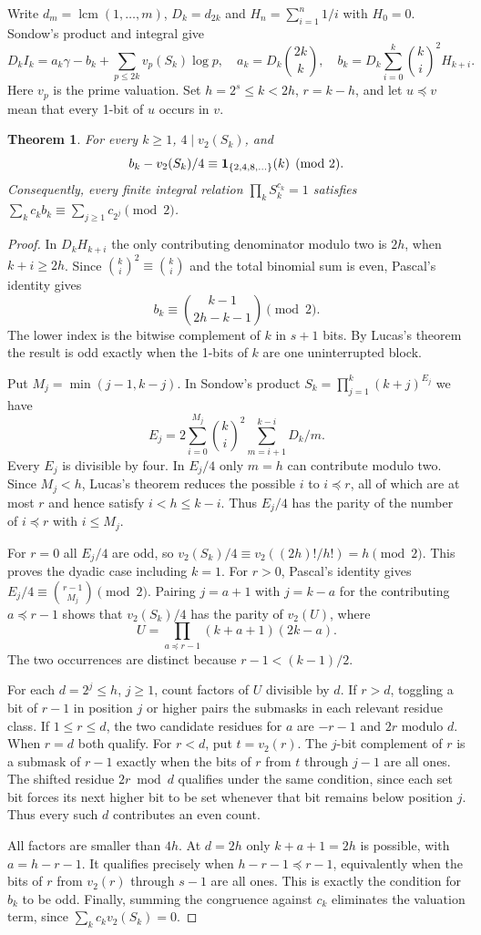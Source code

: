 \documentclass[11pt,a4paper]{article}
\newtheorem{theorem}{Theorem}[section]
\theoremstyle{definition}\newtheorem{definition}[theorem]{Definition}\newtheorem{example}[theorem]{Example}
\theoremstyle{remark}\newtheorem{remark}[theorem]{Remark}
\begin{document}
Write $d_m=\operatorname{lcm}(1,\ldots,m)$, $D_k=d_{2k}$ and $H_n=\sum_{i=1}^n1/i$ with $H_0=0$. Sondow's product and integral give
\[
 D_k I_k=a_k\gamma-b_k+\sum_{p\le 2k}v_p(S_k)\log p,
 \quad a_k=D_k\binom{2k}{k},\quad
 b_k=D_k\sum_{i=0}^k\binom{k}{i}^2H_{k+i}.
\]
Here $v_p$ is the prime valuation. Set $h=2^s\le k<2h$, $r=k-h$, and let $u\preceq v$ mean that every 1-bit of $u$ occurs in $v$.
\begin{theorem}
For every $k\ge1$, $4\mid v_2(S_k)$, and
\[
 b_k- v_2(S_k)/4\equiv {\bf1}_{\{2,4,8,\ldots\}}(k)\pmod2.
\]
Consequently, every finite integral relation $\prod_k S_k^{c_k}=1$ satisfies
$\sum_k c_k b_k\equiv\sum_{j\ge1}c_{2^j}\pmod2$.
\end{theorem}
\begin{proof}
In $D_kH_{k+i}$ the only contributing denominator modulo two is $2h$, when $k+i\ge2h$. Since $\binom{k}{i}^2\equiv\binom{k}{i}$ and the total binomial sum is even, Pascal's identity gives
\[
 b_k\equiv\binom{k-1}{2h-k-1}\pmod2.
\]
The lower index is the bitwise complement of $k$ in $s+1$ bits. By Lucas's theorem the result is odd exactly when the 1-bits of $k$ are one uninterrupted block.

Put $M_j=\min(j-1,k-j)$. In Sondow's product $S_k=\prod_{j=1}^k(k+j)^{E_j}$ we have
\[
 E_j=2\sum_{i=0}^{M_j}\binom{k}{i}^2\sum_{m=i+1}^{k-i}D_k/m .
\]
Every $E_j$ is divisible by four. In $E_j/4$ only $m=h$ can contribute modulo two. Since $M_j<h$, Lucas's theorem reduces the possible $i$ to $i\preceq r$, all of which are at most $r$ and hence satisfy $i<h\le k-i$. Thus $E_j/4$ has the parity of the number of $i\preceq r$ with $i\le M_j$.

For $r=0$ all $E_j/4$ are odd, so $v_2(S_k)/4\equiv v_2((2h)!/h!)=h\pmod2$. This proves the dyadic case including $k=1$.
For $r>0$, Pascal's identity gives $E_j/4\equiv\binom{r-1}{M_j}\pmod2$. Pairing $j=a+1$ with $j=k-a$ for the contributing $a\preceq r-1$ shows that $v_2(S_k)/4$ has the parity of $v_2(U)$, where
\[
 U=\prod_{a\preceq r-1}(k+a+1)(2k-a).
\]
The two occurrences are distinct because $r-1<(k-1)/2$.

For each $d=2^j\le h$, $j\ge1$, count factors of $U$ divisible by $d$. If $r>d$, toggling a bit of $r-1$ in position $j$ or higher pairs the submasks in each relevant residue class. If $1\le r\le d$, the two candidate residues for $a$ are $-r-1$ and $2r$ modulo $d$. When $r=d$ both qualify. For $r<d$, put $t=v_2(r)$. The $j$-bit complement of $r$ is a submask of $r-1$ exactly when the bits of $r$ from $t$ through $j-1$ are all ones. The shifted residue $2r\bmod d$ qualifies under the same condition, since each set bit forces its next higher bit to be set whenever that bit remains below position $j$. Thus every such $d$ contributes an even count.

All factors are smaller than $4h$. At $d=2h$ only $k+a+1=2h$ is possible, with $a=h-r-1$. It qualifies precisely when $h-r-1\preceq r-1$, equivalently when the bits of $r$ from $v_2(r)$ through $s-1$ are all ones. This is exactly the condition for $b_k$ to be odd. Finally, summing the congruence against $c_k$ eliminates the valuation term, since $\sum_kc_kv_2(S_k)=0$.
\end{proof}
\end{document}
